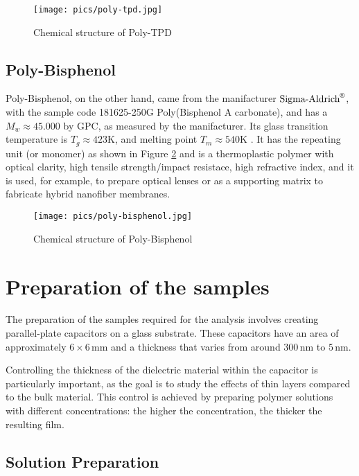 \begin{figure}[htp!]
    \centering
    \hspace*{-0.8cm}
    \texttt{[image: pics/poly-tpd.jpg]}
    \caption{Chemical structure of Poly-TPD}
    \label{ptpid}
\end{figure}

\subsection{Poly-Bisphenol}
Poly-Bisphenol, on the other hand, came from the manifacturer $\text{Sigma-Aldrich}^{\text{\textregistered}}$, with the sample code 181625-250G Poly(Bisphenol A carbonate), and has a $M_w \approx 45.000$ by \ac{GPC}, as measured by the manifacturer. Its glass transition temperature is $T_g \approx 423 \text{K}$, and melting point $T_m \approx 540 \text{K}$ \cite{yin2012}.
It has the repeating unit (or monomer) as shown in Figure \ref{pbis} and is a thermoplastic polymer with optical clarity, high tensile strength/impact resistace, high refractive index, and it is used, for example, to prepare optical lenses or as a supporting matrix to fabricate hybrid nanofiber membranes.

\begin{figure}[htp!]
    \centering
    \hspace*{-0.8cm}
    \texttt{[image: pics/poly-bisphenol.jpg]}
    \caption{Chemical structure of Poly-Bisphenol}
    \label{pbis}
\end{figure}



%
\section{Preparation of the samples}

The preparation of the samples required for the analysis involves creating parallel-plate capacitors on a glass substrate. These capacitors have an area of approximately \( 6 \times 6 \, \text{mm} \) and a thickness that varies from around \( 300 \, \text{nm} \) to \( 5 \, \text{nm} \).

Controlling the thickness of the dielectric material %
within the capacitor is particularly important, as the goal is to study the effects of thin layers compared to the bulk material. This control is achieved by preparing polymer solutions with different concentrations: the higher the concentration, the thicker the resulting film.
\subsection{Solution Preparation}

